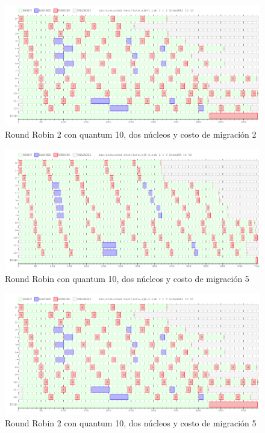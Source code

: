 \documentclass[a4paper]{article}
\begin{document}
\begin{figure}[H]
\begin{center}
\includegraphics[scale=0.4]{imagenes/ej8-1-rr2-c-2.png}
\end{center}
\caption{Round Robin 2 con quantum 10, dos núcleos y costo de migración 2}
\end{figure}

\begin{figure}[H]
\begin{center}
\includegraphics[scale=0.4]{imagenes/ej8-2-rr-c-2-m-5.png}
\end{center}
\caption{Round Robin con quantum 10, dos núcleos y costo de migración 5}
\end{figure}

\begin{figure}[H]
\begin{center}
\includegraphics[scale=0.4]{imagenes/ej8-2-rr2-c-2-m-5.png}
\end{center}
\caption{Round Robin 2 con quantum 10, dos núcleos y costo de migración 5}
\end{figure}
\end{document}
